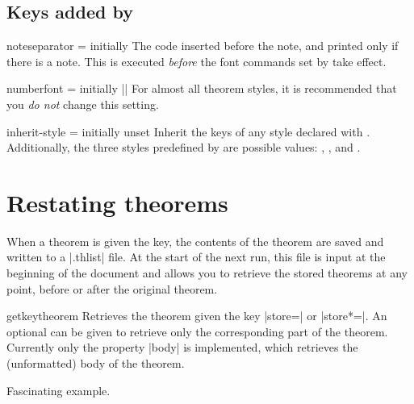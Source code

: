 \documentclass{ltxdoc}
\begin{document}
\subsection{Keys added by }

\begin{docKey}{noteseparator}
  {=}
  {initially \textvisiblespace}
The code inserted before the note, and printed only if there is a note. This is executed \emph{before} the font commands set by  take effect.
\end{docKey}

\begin{docKey}{numberfont}
  {=}
  {initially |\upshape|}
For almost all theorem styles, it is recommended that you \emph{do not} change this setting.
\end{docKey}

\begin{docKey}{inherit-style}
  {=}
  {initially unset}
Inherit the keys of any style declared with .
Additionally, the three styles predefined by  are possible values: , , and .
\end{docKey}

\section{Restating theorems}

When a theorem is given the  key, the contents of the theorem are saved and written to a |.thlist| file.
At the start of the next run, this file is input at the beginning of the document and allows you to retrieve the stored theorems at any point, before or after the original theorem.

\begin{docCommand}{getkeytheorem}
  {}
Retrieves the theorem given the key |store=| or |store*=|.
An optional  can be given to retrieve only the corresponding part of the theorem.
Currently only the property |body| is implemented, which retrieves the (unformatted) body of the theorem.

\begin{keythmscode}[]

\begin{example}[store=mytag]
Fascinating example.
\end{example}

\end{keythmscode}

\end{docCommand}
\end{document}
